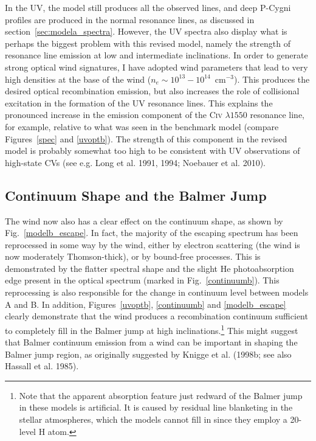 In the UV, the model still produces all the observed lines, 
and deep P-Cygni profiles are produced in the normal resonance lines,
as discussed in section~\ref{sec:modela_spectra}. However, the UV spectra also
display what is perhaps the biggest problem with this revised model,
namely the strength of resonance line emission 
at low and intermediate inclinations.
In order to generate strong optical wind signatures, I have adopted wind
parameters that lead to very high densities at the base of the wind
($n_e\sim10^{13}-10^{14}$~cm$^{-3}$). This produces
the desired optical recombination emission, but also increases the
role of collisional excitation in the formation of the UV resonance
lines. This explains the pronounced increase in the emission component 
of the C\textsc{iv} $\lambda1550$ resonance line, for example, relative to
what was seen in the benchmark model (compare Figures~\ref{spec} and
\ref{uvoptb}). The strength of this component in the revised model 
is probably somewhat too high to be consistent with UV observations 
of high-state CVs (see e.g. Long et al. 1991, 1994; Noebauer et al. 2010).
\nocite{long1991,long1994, noebauer}


\subsection{Continuum Shape and the Balmer Jump}

The wind now also has a clear effect on the continuum shape,
as shown by Fig.~\ref{modelb_escape}. In fact, the majority of the
escaping spectrum has been reprocessed in some way by the wind,
either by electron scattering (the wind is now moderately Thomson-thick),
or by bound-free processes. This is demonstrated by the flatter spectral shape
and the slight He photoabsorption edge present in the optical spectrum 
(marked in Fig.~\ref{continuumb}). This reprocessing is also
responsible for the change in continuum level between models A and B.
In addition, Figures~\ref{uvoptb}, \ref{continuumb} 
and \ref{modelb_escape} clearly demonstrate that the wind produces
a recombination continuum sufficient to completely fill in the Balmer jump
at high inclinations.\footnote{Note that the apparent absorption feature 
just redward of the Balmer jump in these models is artificial. It is
caused by residual line blanketing in the stellar atmospheres, which
the models cannot fill in since they employ a 20-level H atom.}
This might suggest that Balmer continuum emission from a wind can be important 
in shaping the Balmer jump region, as
originally suggested by Knigge et al.
(1998b; see also Hassall et al. 1985)\nocite{KLWB98,hassall}. 

